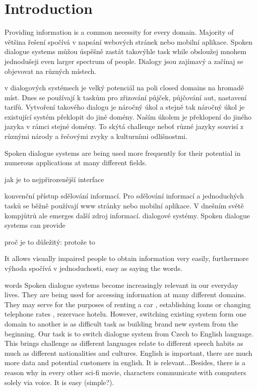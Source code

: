 \chapter*{Introduction}

Providing information is a common necessity for every domain. Majority of většina řešení spočívá v napsání webových stránek nebo mobilní aplikace. Spoken dialogue systems můžou úspěšně zastát takovýhle task while obsloužej mnohem jednodušeji even larger spectrum of people. 
Dialogy jsou zajímavý a začínaj se objevovat na různých místech. 

v dialogových systémech je velký potenciál na poli closed domains na hromadě míst. Dnes se používají k taskům pro zřizování půjček, půjčování aut, nastavení tarifů. Vytvoření takového dialogu je náročný úkol a stejně tak náročný úkol je existující systém překlopit do jiné domény. Naším úkolem je překlopení do jiného jazyka v rámci stejné domény. To skýtá challenge neboť různé jazyky souvisí z různými národy a řečovými zvyky a kulturními odlišnostmi.

Spoken dialogue systems are being used more frequently for their potential in numerous applications at many different fields.

jak je to nejpřirozenější interface

konvenční přístup sdělování informací. Pro sdělování informací a jednoduchých tasků se běžně používají www stránky nebo mobilní aplikace. V dnešním světě kompjůtrů ale emerges další zdroj informací. dialogové systémy. Spoken dialogue systems can provide 

proč je to důležitý: protože to 

It allows visually impaired people to obtain information very easily, furthermore výhoda spočívá v jednoduchosti, easy as saying the words. 



words 	
Spoken dialogue systems become increasingly relevant in our everyday lives.
They are being used for accessing information at many different domains.
They may serve for the purposes of renting a car \cite{CarRental}, establishing loans \cite{Loan} or changing telephone rates \cite{Tarrif}, rezervace hotelu.
However, switching existing system form one domain to another is as difficult task as building brand new system from the beginning.
Our task is to switch dialogue system from Czech to English language.
This brings challenge as different languages relate to different speech habits as much as different nationalities and cultures.
English is important, there are much more data and potential customers in english.
It is relevant...Besides, there is a reason why in every other sci-fi movie, characters communicate with computers solely via voice. It is easy (simple?).


